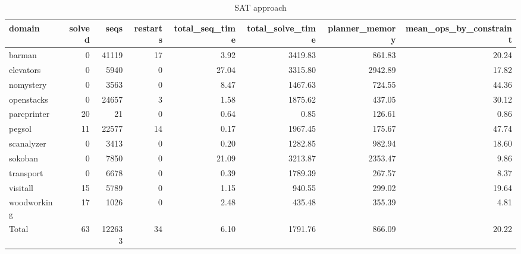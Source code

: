 \begin{table*}[htbp]
\centering
\begingroup\small
\begin{tabular}{lrrrrrrr}
  \hline
domain & solved & seqs & restarts & total\_seq\_time & total\_solve\_time & planner\_memory & mean\_ops\_by\_constraint \\ 
  \hline
barman &   0 & 41119 &  17 & 3.92 & 3419.83 & 861.83 & 20.24 \\ 
  elevators &   0 & 5940 &   0 & 27.04 & 3315.80 & 2942.89 & 17.82 \\ 
  nomystery &   0 & 3563 &   0 & 8.47 & 1467.63 & 724.55 & 44.36 \\ 
  openstacks &   0 & 24657 &   3 & 1.58 & 1875.62 & 437.05 & 30.12 \\ 
  parcprinter &  20 &  21 &   0 & 0.64 & 0.85 & 126.61 & 0.86 \\ 
  pegsol &  11 & 22577 &  14 & 0.17 & 1967.45 & 175.67 & 47.74 \\ 
  scanalyzer &   0 & 3413 &   0 & 0.20 & 1282.85 & 982.94 & 18.60 \\ 
  sokoban &   0 & 7850 &   0 & 21.09 & 3213.87 & 2353.47 & 9.86 \\ 
  transport &   0 & 6678 &   0 & 0.39 & 1789.39 & 267.57 & 8.37 \\ 
  visitall &  15 & 5789 &   0 & 1.15 & 940.55 & 299.02 & 19.64 \\ 
  woodworking &  17 & 1026 &   0 & 2.48 & 435.48 & 355.39 & 4.81 \\ 
  Total &  63 & 122633 &  34 & 6.10 & 1791.76 & 866.09 & 20.22 \\ 
   \hline
\end{tabular}
\endgroup
\caption{SAT approach} 
\label{tab:sat}
\end{table*}
